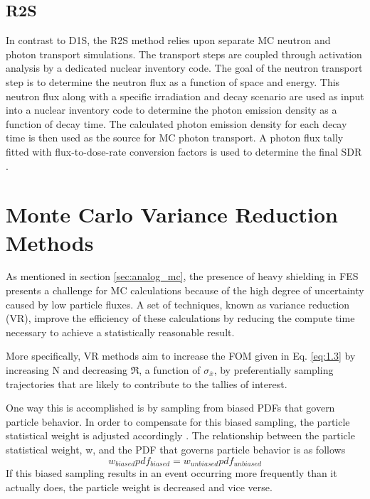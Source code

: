 \subsection{R2S}\label{sec:r2s}
In contrast to D1S, the R2S method relies upon separate MC neutron and photon
transport simulations.  The transport steps are coupled through activation analysis 
by a dedicated nuclear inventory code.
The goal of the neutron transport step is to determine the neutron flux
as a function of space and energy.  This neutron flux along with a specific irradiation
and decay scenario are used as input into a nuclear inventory
code to determine the photon emission density as a function of decay time.
The calculated photon emission density for each decay time
is then used as the source for MC photon transport.  A photon flux tally
fitted with flux-to-dose-rate conversion factors is used to
determine the final SDR \cite{r2s}.

\section{Monte Carlo Variance Reduction Methods}\label{sec:vr_methods}

As mentioned in section \ref{sec:analog_mc}, the presence of heavy shielding in
FES presents a challenge for MC calculations because of the high degree of 
uncertainty caused by low particle fluxes. A set of techniques, known as 
variance reduction (VR),
improve the efficiency of these calculations by reducing the compute time 
necessary to achieve a statistically reasonable result.

More specifically, VR methods aim to increase the FOM given in Eq. \ref{eq:1.3} 
by increasing N and decreasing $\Re$, a function of $\sigma_{\overline{x}}$,
by preferentially sampling trajectories that are likely to
contribute to the tallies of interest.

One way this is accomplished is by sampling from biased PDFs that govern particle behavior. 
In order to compensate for this biased sampling, the particle statistical weight
is adjusted accordingly \cite{cadis}.
The relationship between the particle statistical weight, w, and the PDF that
governs particle behavior is as follows
\begin{equation} \label{eq:2.1}
		w_{biased} pdf_{biased} = w_{unbiased} pdf_{unbiased}
\end{equation}
If this biased sampling results in an event occurring more frequently than it actually does,
the particle weight is decreased and vice verse.

